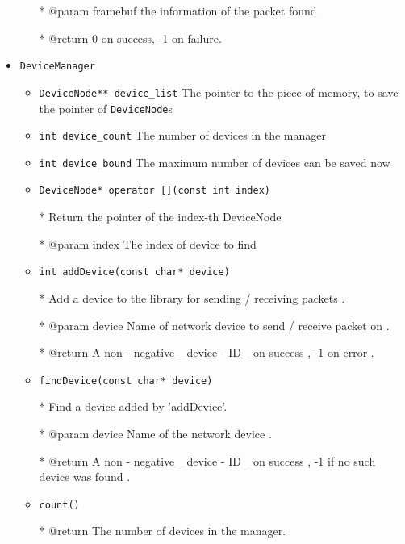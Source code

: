 \documentclass[11pt]{article}
\begin{document}
\begin{itemize}
\begin{itemize}
				* @param framebuf the information of the packet found
				
				* @return 0 on success, -1 on failure. 
				
			\end{itemize}
			
			\item \texttt{DeviceManager}
			
			\begin{itemize}
				\item \texttt{DeviceNode** device\_list} The pointer to the piece of memory, to save the pointer of \texttt{DeviceNode}s
				\item \texttt{int device\_count} The number of devices in the manager
				\item \texttt{int device\_bound} The maximum number of devices can be saved now
				\item \texttt{DeviceNode* operator [](const int index)}
				
				* Return the pointer of the index-th DeviceNode
				
				* @param index The index of device to find
				
				\item \texttt{int addDevice(const char* device)}
				
				* Add a device to the library for sending / receiving packets .
				
				* @param device Name of network device to send / receive packet on .
				
				* @return A non - negative \_device - ID\_ on success , -1 on error .
				
				\item \texttt{findDevice(const char* device)}
				
				* Find a device added by 'addDevice'.
				
				* @param device Name of the network device .
				
				* @return A non - negative \_device - ID\_ on success , -1 if no such device was found .
				
				\item \texttt{count()}
				
				* @return The number of devices in the manager.
			\end{itemize}
		\end{itemize}
	
	
\end{document}
